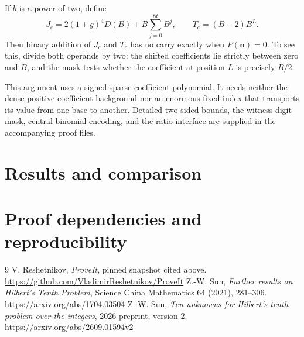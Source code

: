 \documentclass[11pt]{article}
\begin{document}
If $b$ is a power of two, define
\[
 J_c=2(1+g)^4D(B)+B\sum_{j=0}^{8t}B^j,
 \qquad T_c=(B-2)B^L.
\]
Then binary addition of $J_c$ and $T_c$ has no carry exactly when $P(\mathbf n)=0$. To see this, divide both operands by two: the shifted coefficients lie strictly between zero and $B$, and the mask tests whether the coefficient at position $L$ is precisely $B/2$.

This argument uses a signed sparse coefficient polynomial. It needs neither the dense positive coefficient background nor an enormous fixed index that transports its value from one base to another. Detailed two-sided bounds, the witness-digit mask, central-binomial encoding, and the ratio interface are supplied in the accompanying proof files.

\section{Results and comparison}







\section{Proof dependencies and reproducibility}


\begin{thebibliography}{9}
 V. Reshetnikov, \emph{ProveIt}, pinned snapshot cited above.\newline
\url{https://github.com/VladimirReshetnikov/ProveIt}
 Z.-W. Sun, \emph{Further results on Hilbert's Tenth Problem}, Science China Mathematics 64 (2021), 281--306.\newline
\url{https://arxiv.org/abs/1704.03504}
 Z.-W. Sun, \emph{Ten unknowns for Hilbert's tenth problem over the integers}, 2026 preprint, version 2.\newline
\url{https://arxiv.org/abs/2609.01594v2}
\end{thebibliography}
\end{document}
